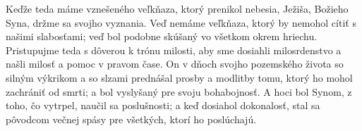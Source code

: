 Keďže teda máme vznešeného veľkňaza, ktorý prenikol nebesia, Ježiša, Božieho Syna, držme sa svojho vyznania. Veď nemáme veľkňaza, ktorý by nemohol cítiť s našimi slabosťami; veď bol podobne skúšaný vo všetkom okrem hriechu. Pristupujme teda s dôverou k trónu milosti, aby sme dosiahli milosrdenstvo a našli milosť a pomoc v pravom čase.
\versseparator
On v dňoch svojho pozemského života so silným výkrikom a so slzami prednášal prosby a modlitby tomu, ktorý ho mohol zachrániť od smrti; a bol vyslyšaný pre svoju bohabojnosť. A hoci bol Synom, z toho, čo vytrpel, naučil sa poslušnosti; a keď dosiahol dokonalosť, stal sa pôvodcom večnej spásy pre všetkých, ktorí ho poslúchajú.